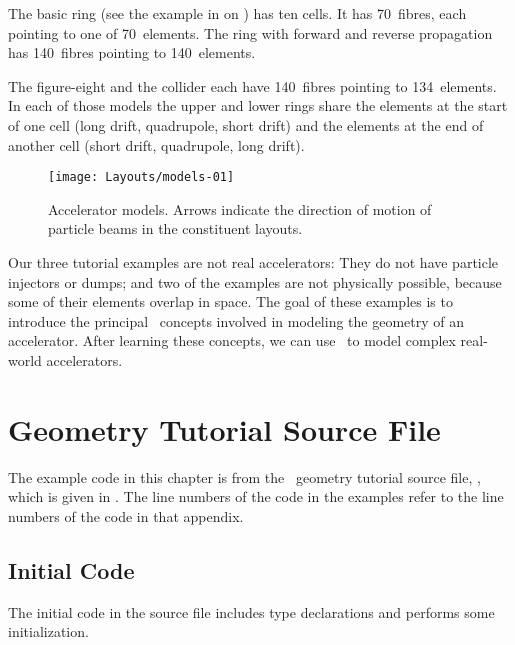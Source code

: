 %
The basic ring (see the  example in 
on ) has ten cells. It has 70~fibres, each pointing
to one of 70~elements. The ring with forward and reverse propagation has
140~fibres pointing to 140~elements.

The figure-eight and the collider each have 140~fibres pointing to
134~elements. In each of those models the upper and lower rings share
the elements at the start of one cell (long drift, quadrupole, short
drift) and the elements at the end of another cell (short drift,
quadrupole, long drift).

\begin{figure}[ht]
  \centering
  \texttt{[image: Layouts/models-01]}
  \caption{Accelerator models. Arrows indicate the direction of motion
           of particle beams in the constituent layouts.}
  \label{fig:accel.models}
\end{figure}

Our three tutorial examples are not real accelerators: They do not
have particle injectors or dumps; and two of the examples are not
physically possible, because some of their elements overlap in space.
The goal of these examples is to introduce the principal \PTC\ concepts
involved in modeling the geometry of an accelerator. After learning
these concepts, we can use \PTC\ to model complex real-world
accelerators.


\section{Geometry Tutorial Source File}
\label{sec:geom.tut}

%
The example code in this chapter is from the \PTC\ geometry tutorial
source file, , which is given in
. The line numbers of the code in the examples
refer to the line numbers of the code in that appendix.


\subsection{Initial Code}
\label{sec:init.code}

The initial code in the  source file
includes type declarations and performs some initialization.

